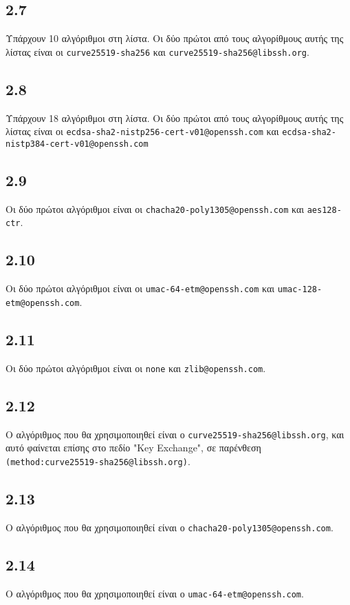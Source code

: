 		\subsection*{2.7}
			Υπάρχουν 10 αλγόριθμοι στη λίστα. Οι δύο πρώτοι από τους αλγορίθμους αυτής της λίστας είναι οι \verb|curve25519-sha256| και \verb|curve25519-sha256@libssh.org|.
	
		\subsection*{2.8}
			Υπάρχουν 18 αλγόριθμοι στη λίστα. Οι δύο πρώτοι από τους αλγορίθμους αυτής της λίστας είναι οι \verb|ecdsa-sha2-nistp256-cert-v01@openssh.com| και 
			\verb|ecdsa-sha2-nistp384-cert-v01@openssh.com|
	
		\subsection*{2.9}
			Οι δύο πρώτοι αλγόριθμοι είναι οι \verb|chacha20-poly1305@openssh.com| και \verb|aes128-ctr|.
	
		\subsection*{2.10}
			Οι δύο πρώτοι αλγόριθμοι είναι οι \verb|umac-64-etm@openssh.com| και \verb|umac-128-etm@openssh.com|.
	
		\subsection*{2.11}
			Οι δύο πρώτοι αλγόριθμοι είναι οι \verb|none| και \verb|zlib@openssh.com|.
			
		\subsection*{2.12}
			Ο αλγόριθμος που θα χρησιμοποιηθεί είναι ο \verb|curve25519-sha256@libssh.org|, και αυτό φαίνεται επίσης στο πεδίο "Key Exchange", σε παρένθεση \verb|(method:curve25519-sha256@libssh.org)|.
	
		\subsection*{2.13}
			Ο αλγόριθμος που θα χρησιμοποιηθεί είναι ο \verb|chacha20-poly1305@openssh.com|.
	
		\subsection*{2.14}
			Ο αλγόριθμος που θα χρησιμοποιηθεί είναι ο \verb|umac-64-etm@openssh.com|.
	
